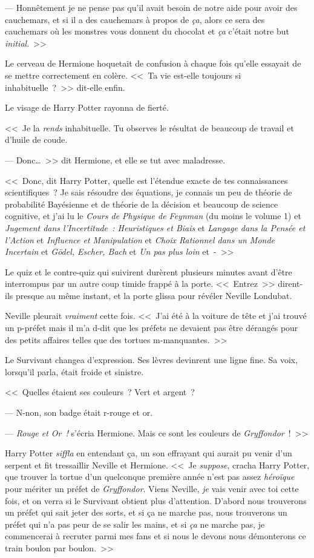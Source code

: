 --- Honnêtement je ne pense pas qu'il avait besoin de notre aide pour avoir des cauchemars, et si il a des cauchemars à propos de \emph{ça}, alors ce sera des cauchemars où les monstres vous donnent du chocolat et \emph{ça} c'était notre but \emph{initial}.~>>

Le cerveau de Hermione hoquetait de confusion à chaque fois qu'elle essayait de se mettre correctement en colère. <<~Ta vie est-elle toujours si inhabituelle~?~>> dit-elle enfin.

Le visage de Harry Potter rayonna de fierté.

<<~Je la \emph{rends} inhabituelle. Tu observes le résultat de beaucoup de travail et d'huile de coude.

--- Donc…~>> dit Hermione, et elle se tut avec maladresse.

<<~Donc, dit Harry Potter, quelle est l'étendue exacte de tes connaissances scientifiques~? Je sais résoudre des équations, je connais un peu de théorie de probabilité Bayésienne et de théorie de la décision et beaucoup de science cognitive, et j'ai lu le \emph{Cours de Physique de Feynman} (du moins le volume 1) et \emph{Jugement dans l'Incertitude~: Heuristiques et Biais} et \emph{Langage dans la Pensée et l'Action} et \emph{Influence et Manipulation} et \emph{Choix Rationnel dans un Monde Incertain} et \emph{Gödel, Escher, Bach} et \emph{Un pas plus loin} et~-~>>

Le quiz et le contre-quiz qui suivirent durèrent plusieurs minutes avant d'être interrompus par un autre coup timide frappé à la porte. <<~Entrez~>> dirent-ils presque au même instant, et la porte glissa pour révéler Neville Londubat.

Neville pleurait \emph{vraiment} cette fois. <<~J'ai été à la voiture de tête et j'ai trouvé un p-préfet mais il m'a d-dit que les préfets ne devaient pas être dérangés pour des petits affaires telles que des tortues m-manquantes.~>>

Le Survivant changea d'expression. Ses lèvres devinrent une ligne fine. Sa voix, lorsqu'il parla, était froide et sinistre.

<<~Quelles étaient ses couleurs~? Vert et argent~?

--- N-non, son badge était r-rouge et or.

--- \emph{Rouge et Or~!} s'écria Hermione. Mais ce sont les couleurs de \emph{Gryffondor}~!~>>

Harry Potter \emph{siffla} en entendant ça, un son effrayant qui aurait pu venir d'un serpent et fit tressaillir Neville et Hermione. <<~Je \emph{suppose}, cracha Harry Potter, que trouver la tortue d'un quelconque première année n'est pas assez \emph{héroïque} pour mériter un préfet de \emph{Gryffondor}. Viens Neville, \emph{je} vais venir avec toi cette fois, et on verra si le Survivant obtient plus d'attention. D'abord nous trouverons un préfet qui sait jeter des sorts, et si ça ne marche pas, nous trouverons un préfet qui n'a pas peur de se salir les mains, et si \emph{ça} ne marche pas, je commencerai à recruter parmi mes fans et si nous le devons nous démonterons ce train boulon par boulon.~>>

